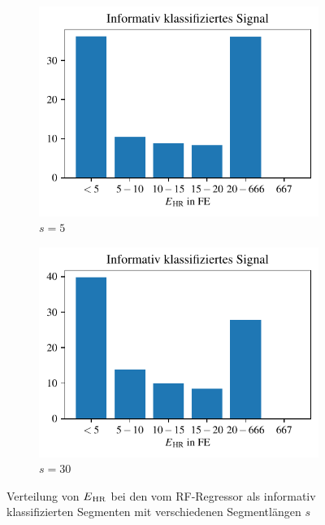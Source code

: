  \begin{figure}[H]
 	\centering
		\begin{subfigure}{.45\textwidth}
			\centering
 			\includegraphics[scale=0.7]{pic/rf-regr-s5-h20-positives.pdf}
 			\caption{$s=5$}
 		\end{subfigure}
    	\begin{subfigure}{.45\textwidth}
    		\centering
 			\includegraphics[scale=0.7]{pic/rf-regr-s30-h20-positives.pdf}
 			\caption{$s=30$}
 		\end{subfigure}
 	\caption{Verteilung von $E\textsubscript{HR}$ bei den vom \ac{RF}-Regressor als informativ klassifizierten Segmenten mit verschiedenen Segmentlängen $s$}
 	\label{fig:rf-regr-var-s-positives}
 \end{figure}

